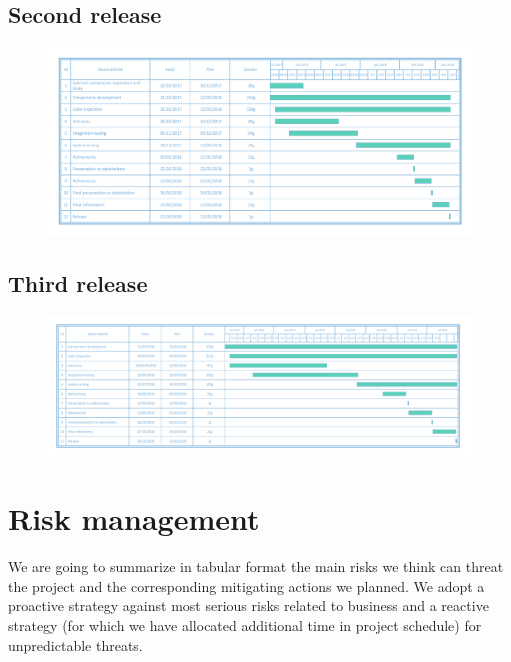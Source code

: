\documentclass[english]{article}
\begin{document}
		\begin{landscape}
	\subsection{Second release}
		\begin{figure}[H]
			\centering
			\includegraphics[scale=0.725]{./Images/6-SecondRelease18.pdf} 
		\end{figure}
		\end{landscape}
		\begin{landscape}
	\subsection{Third release}
		\begin{figure}[H]
			\centering
			\includegraphics[scale=0.55]{./Images/7-ThirdRelease18.pdf} 
		\end{figure}
		\end{landscape}
		
\section{Risk management}

	We are going to summarize in tabular format the main risks we think can threat the project and the corresponding mitigating actions we planned.
	We adopt a proactive strategy against most serious risks related to business and a reactive strategy (for which we have allocated additional time in project schedule) for unpredictable threats.
	
\end{document}
